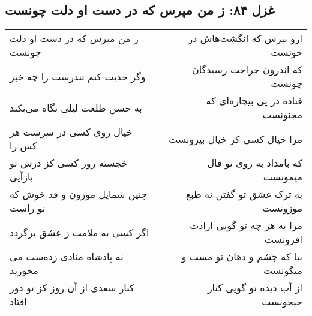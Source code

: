 \begin{center}
\section*{غزل ۸۴: ز من مپرس که در دست او دلت چونست}
\label{sec:084}
\begin{longtable}{l p{0.5cm} r}
ز من مپرس که در دست او دلت چونست
&&
ازو بپرس که انگشت‌هاش در خونست
\\
وگر حدیث کنم تندرست را چه خبر
&&
که اندرون جراحت رسیدگان چونست
\\
به حسن طلعت لیلی نگاه می‌نکند
&&
فتاده در پی بیچاره‌ای که مجنونست
\\
خیال روی کسی در سرست هر کس را
&&
مرا خیال کسی کز خیال بیرونست
\\
خجسته روز کسی کز درش تو بازآیی
&&
که بامداد به روی تو فال میمونست
\\
چنین شمایل موزون و قد خوش که تو راست
&&
به ترک عشق تو گفتن نه طبع موزونست
\\
اگر کسی به ملامت ز عشق برگردد
&&
مرا به هر چه تو گویی ارادت افزونست
\\
نه پادشاه منادی زده‌ست می مخورید
&&
بیا که چشم و دهان تو مست و میگونست
\\
کنار سعدی از آن روز کز تو دور افتاد
&&
از آب دیده تو گویی کنار جیحونست
\\
\end{longtable}
\end{center}
